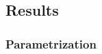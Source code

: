 {\subsection{Results}
\label{subsec:results}













\subsubsection{\textbf{Parametrization}}
\label{ssec:parametrization}

\begin{comment}
\begin{figure*}[tb]
	\captionsetup{justification=centering}
		\begin{subfigure}\textwidth}
		\centering
			\centering
			\includegraphics[scale=0.6] {{exact_leafsize_time_idxproc_cache_legend}}
      \label{fig:exact:leafsize:time:idxproc:rstree}
		\end{subfigure}	\captionsetup[subfigure]{justification=centering}
	\begin{subfigure}{0.05\textwidth}
		\centering
		\includegraphics[width=\columnwidth, trim={0 4.2em 0 2.2em},clip] {{leafsize_y_axis}}
					

\end{comment}}
